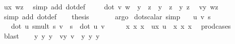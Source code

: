 \begin{isabellebody}
\ ux\ wz\ \isamarkupfalse%
\ {\isacharparenleft}{\kern0pt}simp\ add{\isacharcolon}{\kern0pt}\ dot{\isacharunderscore}{\kern0pt}def{\isacharparenright}{\kern0pt}\isanewline
\ \ \isamarkupfalse%
\ {}{\isacharcolon}{\kern0pt}\ {\isachardoublequoteopen}dot\ v\ w\ {\isacharequal}{\kern0pt}\ y{}\ {\isacharasterisk}{\kern0pt}\ z{}\ {\isacharplus}{\kern0pt}\ y{}\ {\isacharasterisk}{\kern0pt}\ z{}\ {\isacharplus}{\kern0pt}\ y{}\ {\isacharasterisk}{\kern0pt}z{}{\isachardoublequoteclose}\ \isamarkupfalse%
\ vy\ wz\ \isamarkupfalse%
\ {\isacharparenleft}{\kern0pt}simp\ add{\isacharcolon}{\kern0pt}\ dot{\isacharunderscore}{\kern0pt}def{\isacharparenright}{\kern0pt}\isanewline
\ \ \isamarkupfalse%
\ {\isacharquery}{\kern0pt}thesis\ \isamarkupfalse%
\ {}\ {}\ {}\ \isamarkupfalse%
\ argo\isanewline
{}\isamarkupfalse%
%
\endisatagproof
{\isafoldproof}%
%
\isadelimproof
\isanewline
%
\endisadelimproof
\isanewline
{}\isamarkupfalse%
\ dot{\isacharunderscore}{\kern0pt}scalar\ {\isacharbrackleft}{\kern0pt}simp{\isacharbrackright}{\kern0pt}{\isacharcolon}{\kern0pt}\isanewline
\ \ \ u\ v\ s\isanewline
\ \ \ {\isachardoublequoteopen}dot\ u\ {\isacharparenleft}{\kern0pt}smult\ s\ v{\isacharparenright}{\kern0pt}\ {\isacharequal}{\kern0pt}\ s\ {\isacharasterisk}{\kern0pt}\ dot\ u\ v{\isachardoublequoteclose}\isanewline
%
\isadelimproof
%
\endisadelimproof
%
\isatagproof
{}\isamarkupfalse%
\ {\isacharminus}{\kern0pt}\isanewline
\ \ \isamarkupfalse%
\ x{}\ x{}\ x{}\ \ ux{\isacharcolon}{\kern0pt}\ {\isachardoublequoteopen}u\ {\isacharequal}{\kern0pt}\ {\isacharparenleft}{\kern0pt}x{}{\isacharcomma}{\kern0pt}\ x{}{\isacharcomma}{\kern0pt}\ x{}{\isacharparenright}{\kern0pt}{\isachardoublequoteclose}\ \isamarkupfalse%
\ prod{\isacharunderscore}{\kern0pt}cases{}\ \isamarkupfalse%
\ blast\isanewline
\ \ \isamarkupfalse%
\ y{}\ y{}\ y{}\ \ vy{\isacharcolon}{\kern0pt}\ {\isachardoublequoteopen}v\ {\isacharequal}{\kern0pt}\ {\isacharparenleft}{\kern0pt}y{}{\isacharcomma}{\kern0pt}\ y{}{\isacharcomma}{\kern0pt}\ y{}{\isacharparenright}{\kern0pt}{\isachardoublequoteclose}\ \isamarkupfalse%

\end{isabellebody}
